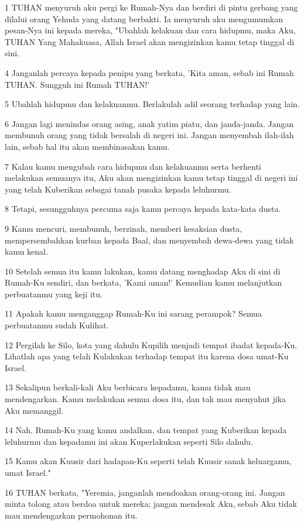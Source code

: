 \par 1 TUHAN menyuruh aku pergi ke Rumah-Nya dan berdiri di pintu gerbang yang dilalui orang Yehuda yang datang berbakti. Ia menyuruh aku mengumumkan pesan-Nya ini kepada mereka, "Ubahlah kelakuan dan cara hidupmu, maka Aku, TUHAN Yang Mahakuasa, Allah Israel akan mengizinkan kamu tetap tinggal di sini.
\par 4 Janganlah percaya kepada penipu yang berkata, 'Kita aman, sebab ini Rumah TUHAN. Sungguh ini Rumah TUHAN!'
\par 5 Ubahlah hidupmu dan kelakuanmu. Berlakulah adil seorang terhadap yang lain.
\par 6 Jangan lagi menindas orang asing, anak yatim piatu, dan janda-janda. Jangan membunuh orang yang tidak bersalah di negeri ini. Jangan menyembah ilah-ilah lain, sebab hal itu akan membinasakan kamu.
\par 7 Kalau kamu mengubah cara hidupmu dan kelakuanmu serta berhenti melakukan semuanya itu, Aku akan mengizinkan kamu tetap tinggal di negeri ini yang telah Kuberikan sebagai tanah pusaka kepada leluhurmu.
\par 8 Tetapi, sesungguhnya percuma saja kamu percaya kepada kata-kata dusta.
\par 9 Kamu mencuri, membunuh, berzinah, memberi kesaksian dusta, mempersembahkan kurban kepada Baal, dan menyembah dewa-dewa yang tidak kamu kenal.
\par 10 Setelah semua itu kamu lakukan, kamu datang menghadap Aku di sini di Rumah-Ku sendiri, dan berkata, 'Kami aman!' Kemudian kamu melanjutkan perbuatanmu yang keji itu.
\par 11 Apakah kamu menganggap Rumah-Ku ini sarang perampok? Semua perbuatanmu sudah Kulihat.
\par 12 Pergilah ke Silo, kota yang dahulu Kupilih menjadi tempat ibadat kepada-Ku. Lihatlah apa yang telah Kulakukan terhadap tempat itu karena dosa umat-Ku Israel.
\par 13 Sekalipun berkali-kali Aku berbicara kepadamu, kamu tidak mau mendengarkan. Kamu melakukan semua dosa itu, dan tak mau menyahut jika Aku memanggil.
\par 14 Nah, Rumah-Ku yang kamu andalkan, dan tempat yang Kuberikan kepada leluhurmu dan kepadamu ini akan Kuperlakukan seperti Silo dahulu.
\par 15 Kamu akan Kuusir dari hadapan-Ku seperti telah Kuusir sanak keluargamu, umat Israel."
\par 16 TUHAN berkata, "Yeremia, janganlah mendoakan orang-orang ini. Jangan minta tolong atau berdoa untuk mereka; jangan mendesak Aku, sebab Aku tidak mau mendengarkan permohonan itu.
